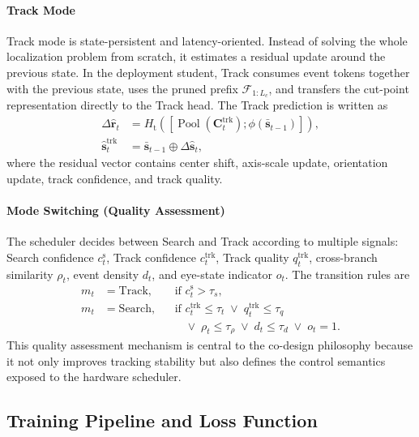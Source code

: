 \documentclass[journal]{IEEEtran}
\begin{document}
\paragraph*{Track Mode}
Track mode is state-persistent and latency-oriented. Instead of solving the whole localization problem from scratch, it estimates a residual update around the previous state. In the deployment student, Track consumes event tokens together with the previous state, uses the pruned prefix $\mathcal F_{1:L_c}$, and transfers the cut-point representation directly to the Track head. The Track prediction is written as
\begin{align}
\Delta \hat{\mathbf r}_t &= H_{\mathrm{t}}\!\left([\operatorname{Pool}(\mathbf C_t^{\mathrm{trk}});\phi(\bar{\mathbf s}_{t-1})]\right),
\\
\hat{\mathbf s}_t^{\mathrm{trk}} &= \bar{\mathbf s}_{t-1}\oplus \Delta\hat{\mathbf s}_t,
\end{align}
where the residual vector contains center shift, axis-scale update, orientation update, track confidence, and track quality.

\paragraph*{Mode Switching (Quality Assessment)}
The scheduler decides between Search and Track according to multiple signals: Search confidence $c_t^{\mathrm{s}}$, Track confidence $c_t^{\mathrm{trk}}$, Track quality $q_t^{\mathrm{trk}}$, cross-branch similarity $\rho_t$, event density $d_t$, and eye-state indicator $o_t$. The transition rules are
\begin{align}
m_t &= \mathrm{Track}, && \text{if } c_t^{\mathrm{s}} > \tau_s, \\
m_t &= \mathrm{Search}, && \text{if } c_t^{\mathrm{trk}}\le\tau_t
\;\vee\; q_t^{\mathrm{trk}}\le\tau_q \nonumber\\
&&& \phantom{\text{if }} \vee\; \rho_t\le\tau_{\rho}
\;\vee\; d_t\le\tau_d
\;\vee\; o_t=1.
\end{align}
This quality assessment mechanism is central to the co-design philosophy because it not only improves tracking stability but also defines the control semantics exposed to the hardware scheduler.

\subsection{Training Pipeline and Loss Function}
\end{document}
